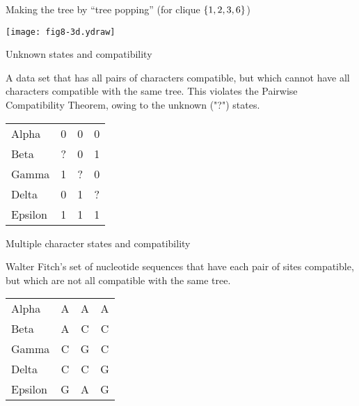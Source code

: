 \documentclass[bluish,slideColor,colorBG,pdf]{prosper}
\begin{document}
\begin{slide}[Replace]{Making the tree by ``tree popping'' }
(for clique $\mathsf\{1, 2, 3, 6\}$)

\centerline{\texttt{[image: fig8-3d.ydraw]}}

\end{slide}

\begin{slide}[Replace]{Unknown states and compatibility}
\bigskip

\noindent
A data set that has all pairs of characters compatible, but which
cannot have all characters compatible with the same tree.  This violates
the Pairwise Compatibility Theorem, owing to the unknown ("?") states.
\bigskip

\begin{center}
\renewcommand{\arraystretch}{1.3}
\begin{tabular}{l | c c c |}
\cline{2-4}
Alpha & 0 & 0 & 0 \\
Beta & ? & 0 & 1 \\
Gamma & 1 & ? & 0 \\
Delta & 0 & 1 & ? \\
Epsilon & 1 & 1 & 1 \\
\cline{2-4}
\end{tabular}
\end{center}

\end{slide}

\begin{slide}[Replace]{Multiple character states and compatibility}

\bigskip

\noindent
Walter Fitch's set of nucleotide sequences that have each pair of
sites compatible, but which are not all compatible with the same tree.
\bigskip


\begin{center}
\renewcommand{\arraystretch}{1.3}
\begin{tabular}{l | c c c |}
\cline{2-4}
Alpha & A & A & A \\
Beta & A & C & C \\
Gamma & C & G & C \\
Delta & C & C & G \\
Epsilon & G & A & G \\
\cline{2-4}
\end{tabular}
\end{center}

\end{slide}
\end{document}
